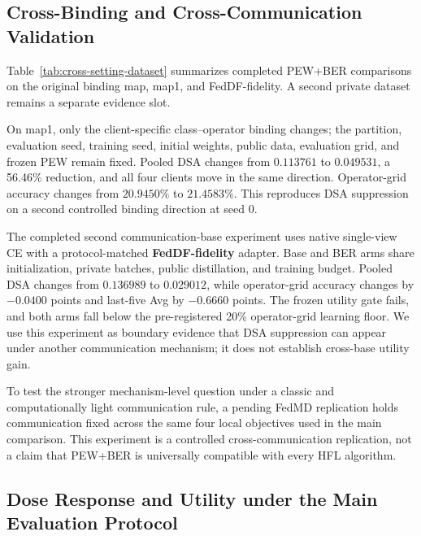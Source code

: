 \subsection{Cross-Binding and Cross-Communication Validation}

Table~\ref{tab:cross-setting-dataset} summarizes completed PEW+BER comparisons on the original binding map, map1, and FedDF-fidelity. A second private dataset remains a separate evidence slot.



On map1, only the client-specific class--operator binding changes; the partition, evaluation seed, training seed, initial weights, public data, evaluation grid, and frozen PEW remain fixed. Pooled DSA changes from \(0.113761\) to \(0.049531\), a 56.46\% reduction, and all four clients move in the same direction. Operator-grid accuracy changes from \(20.9450\%\) to \(21.4583\%\). This reproduces DSA suppression on a second controlled binding direction at seed 0.

The completed second communication-base experiment uses native single-view CE with a protocol-matched \textbf{FedDF-fidelity} adapter. Base and BER arms share initialization, private batches, public distillation, and training budget. Pooled DSA changes from \(0.136989\) to \(0.029012\), while operator-grid accuracy changes by \(-0.0400\) points and last-five Avg by \(-0.6660\) points. The frozen utility gate fails, and both arms fall below the pre-registered 20\% operator-grid learning floor. We use this experiment as boundary evidence that DSA suppression can appear under another communication mechanism; it does not establish cross-base utility gain.

To test the stronger mechanism-level question under a classic and computationally light communication rule, a pending FedMD replication holds communication fixed across the same four local objectives used in the main comparison. This experiment is a controlled cross-communication replication, not a claim that PEW+BER is universally compatible with every HFL algorithm.


\subsection{Dose Response and Utility under the Main Evaluation Protocol}

